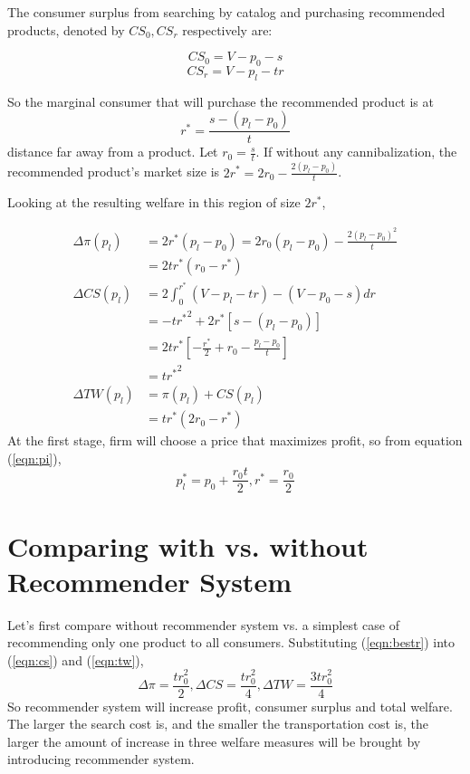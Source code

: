 \documentclass[11pt, oneside]{article}   	%
\begin{document}
The consumer surplus from searching by catalog and purchasing recommended products, denoted by $CS_0, CS_r$ respectively are:

\[CS_0 = V - p_0 - s\]
\[CS_r = V - p_l - tr\]

So the marginal consumer that will purchase the recommended product is at 
\begin{equation} r^* = \frac{s - (p_l-p_0)}{t} \end{equation} distance far away from a product. Let $r_0 = \frac{s}{t}$. If without any cannibalization, the recommended product's market size is $2r^* = 2r_0 - \frac{2(p_l - p_0)}{t}$. 

Looking at the resulting welfare in this region of size $2r^*$,

\begin{align}
\Delta \pi (p_l) &= 2r^*(p_l - p_0) = 2r_0(p_l - p_0) - \frac{2(p_l - p_0)^2}{t} \nonumber\\
&=2tr^*(r_0 - r^*) \label{eqn:pi}\\
\Delta CS(p_l) &= 2\int_0^{r^*} (V - p_l - tr) - (V - p_0 -s)dr  \nonumber\\
&=  -t{r^*}^2+ 2r^*[s -(p_l - p_0)] \nonumber\\
&=2tr^*[-\frac{r^*}{2} + r_0 - \frac{p_l - p_0}{t}]  \nonumber\\
&= t{r^*}^2 \label{eqn:cs} \\
\Delta TW(p_l) &= \pi(p_l) + CS(p_l)  \nonumber \\
&=  tr^*(2r_0 - r^*) \label{eqn:tw}
\end{align}
At the first stage, firm will choose a price that maximizes profit, so from equation (\ref{eqn:pi}), 
\begin{equation} p_l^* = p_0 + \frac{r_0t}{2}, r^* = \frac{r_0}{2} \label{eqn:bestr}\end{equation}
\section{Comparing with vs. without Recommender System}
Let's first compare without recommender system vs. a simplest case of recommending only one product to all consumers. Substituting (\ref{eqn:bestr}) into (\ref{eqn:cs}) and (\ref{eqn:tw}), 
\[\Delta \pi = \frac{tr_0^2}{2}, \Delta CS = \frac{tr_0^2}{4}, \Delta TW = \frac{3tr_0^2}{4}\]
So recommender system will increase profit, consumer surplus and total welfare. The larger the search cost is, and the smaller the transportation cost is, the larger the amount of increase in three welfare measures will be brought by introducing recommender system.
\end{document}
